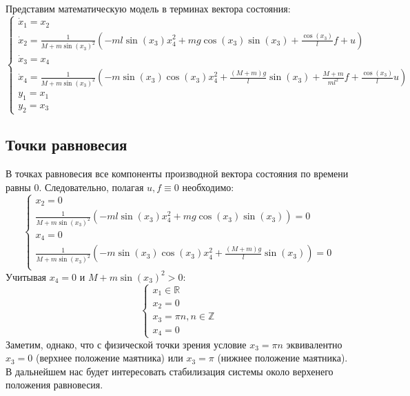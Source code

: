 Представим математическую модель в терминах вектора состояния:
\begin{equation} \label{eq:7}
    \begin{cases}
        \dot x_1 = x_2 \\
        \dot x_2 = \frac{1}{M + m\sin(x_3)^2}( -ml\sin(x_3)x_4^2 + mg\cos(x_3)\sin(x_3) + \frac{\cos(x_3)}{l}f + u ) \\
        \dot x_3 = x_4 \\
        \dot x_4 = \frac{1}{M + m\sin(x_3)^2}( -m\sin(x_3)\cos(x_3)x_4^2 + \frac{(M+m)g}{l}\sin(x_3) + \frac{M+m}{ml^2}f + \frac{\cos(x_3)}{l}u ) \\
        y_1 = x_1 \\
        y_2 = x_3
    \end{cases}
\end{equation}

\subsection{Точки равновесия}
В точках равновесия все компоненты производной вектора состояния по времени равны $0$. Следовательно, полагая $u, f \equiv 0$
необходимо:
\begin{equation} \label{eq:8}
    \begin{cases}
        x_2 = 0 \\
        \frac{1}{M + m\sin(x_3)^2}( -ml\sin(x_3)x_4^2 + mg\cos(x_3)\sin(x_3) ) = 0 \\
        x_4 = 0 \\
        \frac{1}{M + m\sin(x_3)^2}( -m\sin(x_3)\cos(x_3)x_4^2 + \frac{(M+m)g}{l}\sin(x_3) ) = 0 \\
    \end{cases}
\end{equation}
Учитывая $x_4 = 0$ и $M + m\sin(x_3)^2 > 0$:
\begin{equation} \label{eq:9}
    \begin{cases}
        x_1 \in \mathbb{R} \\
        x_2 = 0 \\
        x_3 = \pi n, n \in \mathbb{Z} \\ 
        x_4 = 0 
    \end{cases}
\end{equation}
Заметим, однако, что с физической точки зрения условие $x_3 = \pi n$ эквивалентно $x_3 = 0$ (верхнее положение маятника) или $x_3 = \pi$ (нижнее положение маятника). В дальнейшем нас будет интересовать стабилизация системы около верхенего положения равновесия.

